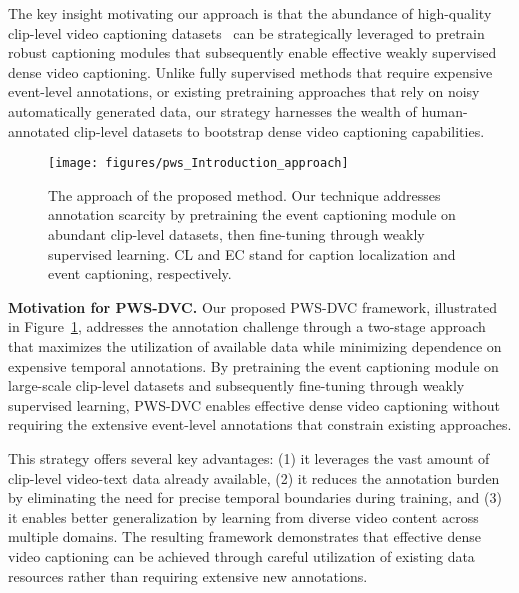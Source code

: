 The key insight motivating our approach is that the abundance of high-quality clip-level video captioning datasets~\cite{Xu2016-ti,Bain2021-si,Wang2019-tk} can be strategically leveraged to pretrain robust captioning modules that subsequently enable effective weakly supervised dense video captioning. Unlike fully supervised methods that require expensive event-level annotations, or existing pretraining approaches that rely on noisy automatically generated data, our strategy harnesses the wealth of human-annotated clip-level datasets to bootstrap dense video captioning capabilities.

\begin{figure}[t]
    \centering
    \texttt{[image: figures/pws\_Introduction\_approach]}
    \caption{The approach of the proposed method. Our technique addresses annotation scarcity by pretraining the event captioning module on abundant clip-level datasets, then fine-tuning through weakly supervised learning.
        CL and EC stand for caption localization and event captioning, respectively.}
    \label{fig:approach}
\end{figure}

\textbf{Motivation for PWS-DVC.}
Our proposed PWS-DVC framework, illustrated in Figure~\ref{fig:approach}, addresses the annotation challenge through a two-stage approach that maximizes the utilization of available data while minimizing dependence on expensive temporal annotations. By pretraining the event captioning module on large-scale clip-level datasets and subsequently fine-tuning through weakly supervised learning, PWS-DVC enables effective dense video captioning without requiring the extensive event-level annotations that constrain existing approaches.

This strategy offers several key advantages: (1) it leverages the vast amount of clip-level video-text data already available, (2) it reduces the annotation burden by eliminating the need for precise temporal boundaries during training, and (3) it enables better generalization by learning from diverse video content across multiple domains. The resulting framework demonstrates that effective dense video captioning can be achieved through careful utilization of existing data resources rather than requiring extensive new annotations.

